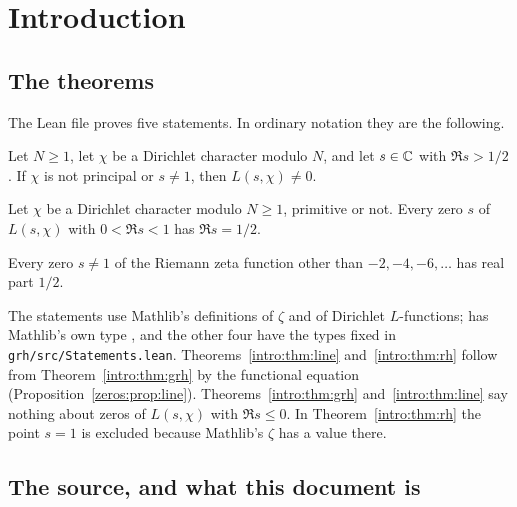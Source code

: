 \section{Introduction}\label{sec:intro}

\subsection{The theorems}

The Lean file  proves five statements. In ordinary notation they are the following.

\begin{theorem}\label{intro:thm:grh}
Let $N \ge 1$, let $\chi$ be a Dirichlet character modulo $N$, and let $s \in \mathbb{C}$ with
$\Re s > 1/2$. If $\chi$ is not principal or $s \ne 1$, then $L(s,\chi) \ne 0$.
\end{theorem}

\begin{theorem}
\label{intro:thm:line}
Let $\chi$ be a Dirichlet character modulo $N \ge 1$, primitive or not. Every zero $s$ of
$L(s,\chi)$ with $0 < \Re s < 1$ has $\Re s = 1/2$.
\end{theorem}

\begin{theorem}\label{intro:thm:rh}
Every zero $s \ne 1$ of the Riemann zeta function other than $-2, -4, -6, \dots$ has real part
$1/2$.
\end{theorem}

The statements use Mathlib's definitions of $\zeta$ and of Dirichlet $L$-functions;
 has Mathlib's own type , and the other four have
the types fixed in \texttt{grh/src/Statements.lean}. Theorems~\ref{intro:thm:line}
and~\ref{intro:thm:rh} follow from Theorem~\ref{intro:thm:grh} by the functional equation
(Proposition~\ref{zeros:prop:line}). Theorems~\ref{intro:thm:grh} and~\ref{intro:thm:line} say
nothing about zeros of $L(s,\chi)$ with $\Re s \le 0$. In Theorem~\ref{intro:thm:rh} the point
$s = 1$ is excluded because Mathlib's $\zeta$ has a value there.

\subsection{The source, and what this document is}

